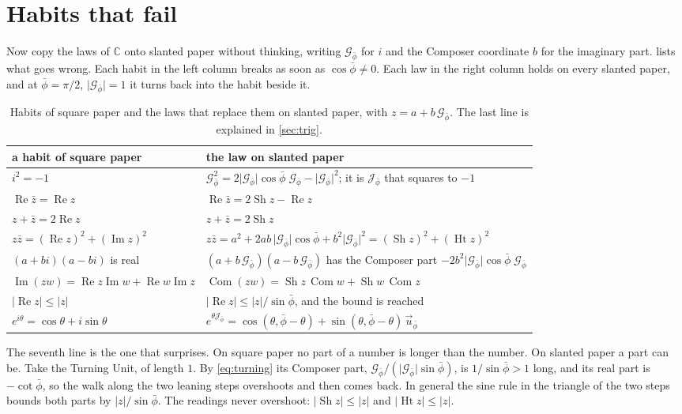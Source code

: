 \documentclass[11pt,a4paper]{article}
\theoremstyle{plain}
\theoremstyle{definition}
\newcommand{\pb}{\bar{\phi}}                     %
\newcommand{\Gp}{\mathcal{G}_{\bar{\phi}}}       %
\newcommand{\up}{\vec{u}_{\bar{\phi}}}           %
\newcommand{\Jp}{\mathcal{J}_{\bar{\phi}}}       %
\newcommand{\C}{\mathbb{C}}
\newcommand{\G}{\lvert\Gp\rvert}                 %
\renewcommand{\Re}{\operatorname{Re}}
\DeclareMathOperator{\Com}{Com}
\DeclareMathOperator{\Sh}{Sh}
\DeclareMathOperator{\Ht}{Ht}
\begin{document}
\section{Habits that fail}

Now copy the laws of $\C$ onto slanted paper without thinking, writing $\Gp$ for $i$ and the Composer coordinate $b$ for the imaginary part.  lists what goes wrong. Each habit in the left column breaks as soon as $\cos\pb \neq 0$. Each law in the right column holds on every slanted paper, and at $\pb = \pi/2$, $\G = 1$ it turns back into the habit beside it.

\begin{table}[tb]
\centering
\small
\renewcommand{\arraystretch}{1.3}
\begin{tabular}{@{}l l@{}}
\toprule
\textbf{a habit of square paper} & \textbf{the law on slanted paper} \\
\midrule
$i^2 = -1$ & $\Gp^2 = 2\G\cos\pb\;\Gp - \G^2$; it is $\Jp$ that squares to $-1$ \\
$\Re\bar z = \Re z$ & $\Re\bar z = 2\Sh z - \Re z$ \\
$z + \bar z = 2\Re z$ & $z + \bar z = 2\Sh z$ \\
$z\bar z = (\Re z)^2 + (\operatorname{Im} z)^2$ & $z\bar z = a^2 + 2ab\,\G\cos\pb + b^2\G^2 = (\Sh z)^2 + (\Ht z)^2$ \\
$(a + bi)(a - bi)$ is real & $(a + b\,\Gp)(a - b\,\Gp)$ has the Composer part $-2b^2\G\cos\pb\;\Gp$ \\
$\operatorname{Im}(zw) = \Re z\operatorname{Im} w + \Re w\operatorname{Im} z$ & $\Com(zw) = \Sh z\,\Com w + \Sh w\,\Com z$ \\
$\lvert\Re z\rvert \le \lvert z\rvert$ & $\lvert\Re z\rvert \le \lvert z\rvert/\sin\pb$, and the bound is reached \\
$e^{i\theta} = \cos\theta + i\sin\theta$ & $e^{\theta\Jp} = \cos(\theta, \pb - \theta) + \sin(\theta, \pb - \theta)\,\up$ \\
\bottomrule
\end{tabular}
\caption{Habits of square paper and the laws that replace them on slanted paper, with $z = a + b\,\Gp$. The last line is explained in \cref{sec:trig}.}
\label{tab:habits}
\end{table}

The seventh line is the one that surprises. On square paper no part of a number is longer than the number. On slanted paper a part can be. Take the Turning Unit, of length $1$. By \eqref{eq:turning} its Composer part, $\Gp/(\G\sin\pb)$, is $1/\sin\pb > 1$ long, and its real part is $-\cot\pb$, so the walk along the two leaning steps overshoots and then comes back. In general the sine rule in the triangle of the two steps bounds both parts by $\lvert z\rvert/\sin\pb$. The readings never overshoot: $\lvert\Sh z\rvert \le \lvert z\rvert$ and $\lvert\Ht z\rvert \le \lvert z\rvert$.
\end{document}
